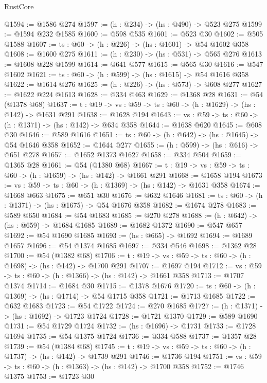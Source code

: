 \begin{lexlean}{RustCore}
\begin{coremodule}
@1594 := @1586 @274
@1597 := (h : @234) -> (hs : @490) -> @523 @275
@1599 := @1594 @232 @1585
@1600 := @598 @535
@1601 := @523 @30
@1602 := @505 @1588
@1607 := {ts : @60} -> (h : @226) -> (hs : @1601) -> @54 @1602 @358
@1608 := @1600 @275
@1611 := (h : @230) -> (hs : @531) -> @565 @276
@1613 := @1608 @228 @1599
@1614 := @641 @577
@1615 := @565 @30
@1616 := @547 @1602
@1621 := {ts : @60} -> (h : @599) -> (hs : @1615) -> @54 @1616 @358
@1622 := @1614 @276
@1625 := (h : @226) -> (hs : @573) -> @608 @277
@1627 := @1622 @224 @1613
@1628 := @334 @463
@1629 := @1368 @28
@1631 := @54 (@1378 @68)
@1637 := {t : @19} -> {vs : @59} -> {ts : @60} -> (h : @1629) -> (hs : @142) -> @1631 @291
@1638 := @1628 @194
@1643 := {vs : @59} -> {ts : @60} -> (h : @1371) -> (hs : @142) -> @634 @358
@1644 := @1638 @620
@1645 := @608 @30
@1646 := @589 @1616
@1651 := {ts : @60} -> (h : @642) -> (hs : @1645) -> @54 @1646 @358
@1652 := @1644 @277
@1655 := (h : @599) -> (hs : @616) -> @651 @278
@1657 := @1652 @1373 @1627
@1658 := @334 @504
@1659 := @1365 @28
@1661 := @54 (@1380 @68)
@1667 := {t : @19} -> {vs : @59} -> {ts : @60} -> (h : @1659) -> (hs : @142) -> @1661 @291
@1668 := @1658 @194
@1673 := {vs : @59} -> {ts : @60} -> (h : @1369) -> (hs : @142) -> @1631 @358
@1674 := @1668 @663
@1675 := @651 @30
@1676 := @632 @1646
@1681 := {ts : @60} -> (h : @1371) -> (hs : @1675) -> @54 @1676 @358
@1682 := @1674 @278
@1683 := @589 @650
@1684 := @54 @1683
@1685 := @270 @278
@1688 := (h : @642) -> (hs : @659) -> @1684 @1685
@1689 := @1682 @1372
@1690 := @547 @657
@1692 := @54 @1690 @1685
@1693 := (hs : @665) -> @1692
@1694 := @1689 @1657
@1696 := @54 @1374 @1685
@1697 := @334 @546
@1698 := @1362 @28
@1700 := @54 (@1382 @68)
@1706 := {t : @19} -> {vs : @59} -> {ts : @60} -> (h : @1698) -> (hs : @142) -> @1700 @291
@1707 := @1697 @194
@1712 := {vs : @59} -> {ts : @60} -> (h : @1366) -> (hs : @142) -> @1661 @358
@1713 := @1707 @1374
@1714 := @1684 @30
@1715 := @1378 @1676
@1720 := {ts : @60} -> (h : @1369) -> (hs : @1714) -> @54 @1715 @358
@1721 := @1713 @1685
@1722 := @632 @1683
@1723 := @54 @1722
@1724 := @270 @1685
@1727 := (h : @1371) -> (hs : @1692) -> @1723 @1724
@1728 := @1721 @1370
@1729 := @589 @1690
@1731 := @54 @1729 @1724
@1732 := (hs : @1696) -> @1731
@1733 := @1728 @1694
@1735 := @54 @1375 @1724
@1736 := @334 @588
@1737 := @1357 @28
@1739 := @54 (@1384 @68)
@1745 := {t : @19} -> {vs : @59} -> {ts : @60} -> (h : @1737) -> (hs : @142) -> @1739 @291
@1746 := @1736 @194
@1751 := {vs : @59} -> {ts : @60} -> (h : @1363) -> (hs : @142) -> @1700 @358
@1752 := @1746 @1375
@1753 := @1723 @30

\end{coremodule}
\end{lexlean}
